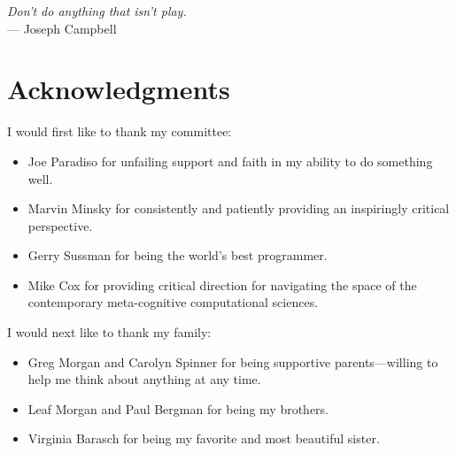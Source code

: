 



\begin{flushright}{\slshape    
Don't do anything that isn't play.} \\ \medskip
    --- Joseph Campbell
\end{flushright}



\bigskip

\begingroup
\let\clearpage\relax
\let\cleardoublepage\relax
\let\cleardoublepage\relax
\chapter*{Acknowledgments}

I would first like to thank my committee:

\begin{itemize}
\item{Joe Paradiso for unfailing support and faith in my ability to do
  something well.}
\item{Marvin Minsky for consistently and patiently providing an
  inspiringly critical perspective.}
\item{Gerry Sussman for being the world's best programmer.}
\item{Mike Cox for providing critical direction for navigating the
  space of the contemporary meta-cognitive computational sciences.}
\end{itemize}

I would next like to thank my family:

\begin{itemize}
\item{Greg Morgan and Carolyn Spinner for being supportive parents---willing to help me think about anything at any time.}
\item{Leaf Morgan and Paul Bergman for being my brothers.}
\item{Virginia Barasch for being my favorite and most beautiful sister.}
\end{itemize}


\endgroup



